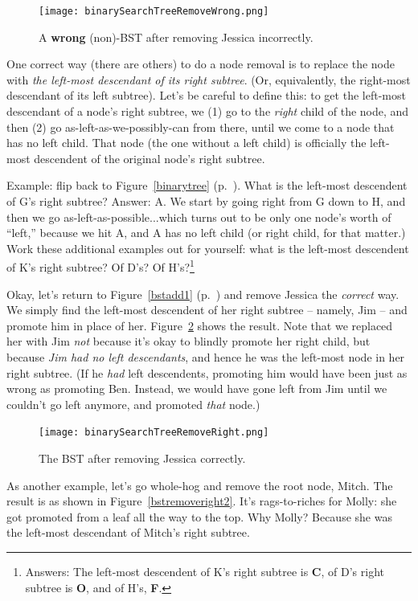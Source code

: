 \begin{figure}[ht]
\centering
\texttt{[image: binarySearchTreeRemoveWrong.png]}
\caption{A \textbf{wrong} (non)-BST after removing Jessica incorrectly.}
\label{bstremovewrong}
\end{figure}

One correct way (there are others) to do a node removal is to replace the node
with \textit{the left-most descendant of its right subtree}. (Or, equivalently,
the right-most descendant of its left subtree). Let's be careful to define
this: to get the left-most descendant of a node's right subtree, we (1) go to
the \textit{right} child of the node, and then (2) go
as-left-as-we-possibly-can from there, until we come to a node that has no
left child. That node (the one without a left child) is officially the
left-most descendent of the original node's right subtree.

Example: flip back to Figure~\ref{binarytree} (p.~\pageref{binarytree}). What
is the left-most descendent of G's right subtree? Answer: A. We start by going
right from G down to H, and then we go as-left-as-possible...which turns out to
be only one node's worth of ``left,'' because we hit A, and A has no left child
(or right child, for that matter.) Work these additional examples out for
yourself: what is the left-most descendent of K's right subtree? Of D's? Of
H's?\footnote{Answers: The left-most descendent of K's right subtree is
\textbf{C}, of D's right subtree is \textbf{O}, and of H's, \textbf{F}.}

Okay, let's return to Figure~\ref{bstadd1} (p.~\pageref{bstadd1}) and remove
Jessica the \textit{correct} way. We simply find the left-most descendent of
her right subtree -- namely, Jim -- and promote him in place of her.
Figure~\ref{bstremoveright} shows the result. Note that we replaced her with
Jim \textit{not} because it's okay to blindly promote her right child, but
because \textit{Jim had no left descendants}, and hence he was the left-most
node in her right subtree. (If he \textit{had} left descendents, promoting him
would have been just as wrong as promoting Ben. Instead, we would have gone
left from Jim until we couldn't go left anymore, and promoted \textit{that}
node.)

\begin{figure}[ht]
\centering
\texttt{[image: binarySearchTreeRemoveRight.png]}
\caption{The BST after removing Jessica correctly.}
\label{bstremoveright}
\end{figure}

As another example, let's go whole-hog and remove the root node, Mitch. The
result is as shown in Figure~\ref{bstremoveright2}. It's rags-to-riches for
Molly: she got promoted from a leaf all the way to the top. Why Molly?
Because she was the left-most descendant of Mitch's right subtree.

